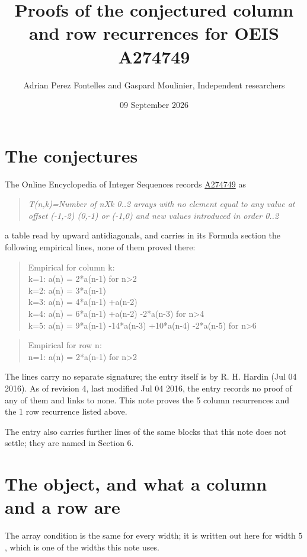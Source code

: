 \documentclass[11pt]{article}
\title{Proofs of the conjectured column and row recurrences for OEIS A274749}
\author{Adrian Perez Fontelles and Gaspard Moulinier, Independent researchers}
\date{09 September 2026}
\theoremstyle{definition}
\begin{document}
\maketitle
\section{The conjectures}

The Online Encyclopedia of Integer Sequences records \href{https://oeis.org/A274749}{A274749} as

\begin{quote}\itshape T(n,k)=Number of nXk 0..2 arrays with no element equal to any value at offset (-1,-2) (0,-1) or (-1,0) and new values introduced in order 0..2\end{quote}

a table read by upward antidiagonals, and carries in its Formula section the following empirical lines, none of them proved there:

\begin{quote}\ttfamily Empirical for column k:\\
k=1: a(n) = 2*a(n-1) for n>2\\k=2: a(n) = 3*a(n-1)\\k=3: a(n) = 4*a(n-1) +a(n-2)\\k=4: a(n) = 6*a(n-1) +a(n-2) -2*a(n-3) for n>4\\k=5: a(n) = 9*a(n-1) -14*a(n-3) +10*a(n-4) -2*a(n-5) for n>6\end{quote}

\begin{quote}\ttfamily Empirical for row n:\\
n=1: a(n) = 2*a(n-1) for n>2\end{quote}

The lines carry no separate signature; the entry itself is by R. H. Hardin (Jul 04 2016). As of revision 4, last modified Jul 04 2016, the entry records no proof of any of them and links to none. This note proves the 5 column recurrences and the 1 row recurrence listed above.

The entry also carries further lines of the same blocks that this note does not settle; they are named in Section 6.

\section{The object, and what a column and a row are}

The array condition is the same for every width; it is written out here for width $5$, which is one of the widths this note uses.
\end{document}
